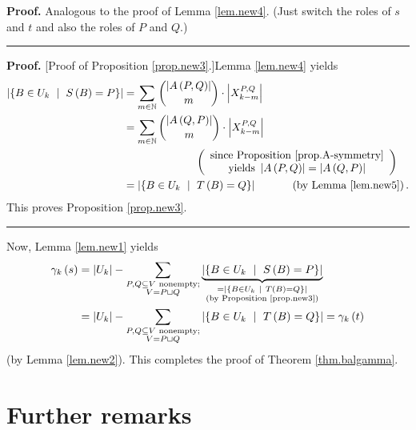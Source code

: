 \documentclass[numbers=enddot,12pt,final,onecolumn,notitlepage]{scrartcl}%
\theoremstyle{definition}
\newenvironment{proof}[1][Proof]{\noindent\textbf{#1.} }{\ \rule{0.5em}{0.5em}}
\let\sumnonlimits\sum
\renewcommand{\sum}{\sumnonlimits\limits}
\theoremstyle{plainsl}
\begin{document}
\begin{proof}
Analogous to the proof of Lemma \ref{lem.new4}. (Just switch the roles of $s$
and $t$ and also the roles of $P$ and $Q$.)
\end{proof}

\begin{proof}
[Proof of Proposition \ref{prop.new3}.]Lemma \ref{lem.new4} yields%
\begin{align*}
\left\vert \left\{  B\in U_{k}\ \mid\ S\left(  B\right)  =P\right\}
\right\vert  &  =\sum_{m\in\mathbb{N}}\dbinom{\left\vert A\left(  P,Q\right)
\right\vert }{m}\cdot\left\vert X_{k-m}^{P,Q}\right\vert \\
&  =\sum_{m\in\mathbb{N}}\dbinom{\left\vert A\left(  Q,P\right)  \right\vert
}{m}\cdot\left\vert X_{k-m}^{P,Q}\right\vert \\
&  \ \ \ \ \ \ \ \ \ \ \ \ \ \ \ \ \ \ \ \ \left(
\begin{array}
[c]{c}%
\text{since Proposition \ref{prop.A-symmetry}}\\
\text{yields }\left\vert A\left(  P,Q\right)  \right\vert =\left\vert A\left(
Q,P\right)  \right\vert
\end{array}
\right) \\
&  =\left\vert \left\{  B\in U_{k}\ \mid\ T\left(  B\right)  =Q\right\}
\right\vert \ \ \ \ \ \ \ \ \ \ \left(  \text{by Lemma \ref{lem.new5}}\right)
.
\end{align*}
This proves Proposition \ref{prop.new3}.
\end{proof}

Now, Lemma \ref{lem.new1} yields%
\begin{align*}
\gamma_{k}\left(  s\right)   &  =\left\vert U_{k}\right\vert -\sum
_{\substack{P,Q\subseteq V\text{ nonempty;}\\V=P\sqcup Q}%
}\underbrace{\left\vert \left\{  B\in U_{k}\ \mid\ S\left(  B\right)
=P\right\}  \right\vert }_{\substack{=\left\vert \left\{  B\in U_{k}%
\ \mid\ T\left(  B\right)  =Q\right\}  \right\vert \\\text{(by Proposition
\ref{prop.new3})}}}\\
&  =\left\vert U_{k}\right\vert -\sum_{\substack{P,Q\subseteq V\text{
nonempty;}\\V=P\sqcup Q}}\left\vert \left\{  B\in U_{k}\ \mid\ T\left(
B\right)  =Q\right\}  \right\vert =\gamma_{k}\left(  t\right)
\end{align*}
(by Lemma \ref{lem.new2}). This completes the proof of Theorem
\ref{thm.balgamma}.

\section{Further remarks}
\end{document}
